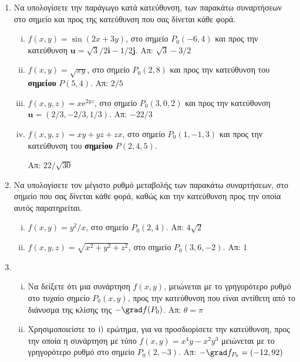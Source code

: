 \begin{enumerate}

  \item Να υπολογίσετε την παράγωγο κατά κατεύθυνση, των παρακάτω συναρτήσεων στο σημείο 
    και προς της κατεύθυνση που σας δίνεται κάθε φορά.
    \begin{enumerate}[i)]
      \item $ f(x,y) = \sin{(2x+3y)} $, στο σημείο $ P_{0}(-6,4) $ και προς την
        κατεύθυνση  $ \mathbf{u} = \sqrt{3} /2 \mathbf{i} - 1/2 \mathbf{j}$. 
        \hfill Απ: $ \sqrt{3} - 3/2 $ 
      \item $ f(x,y) = \sqrt{xy} $, στο σημείο $ P_{0}(2,8) $ και προς την
        κατεύθυνση του \textbf{σημείου} $P(5,4) $. \hfill Απ: $ 2 / 5 $ 
      \item $ f(x,y,z) = x \mathrm{e}^{2yz} $, στο σημείο $ P_{0}(3,0,2) $ και προς την
        κατεύθυνση  $ \mathbf{u} = (2/3, -2/3 , 1/3) $. 
        \hfill Απ: $-22/3$ 
      \item $ f(x,y,z) = xy+yz+zx $, στο σημείο $ P_{0}(1,-1,3) $ και προς την
        κατεύθυνση  του \textbf{σημείου} $P(2,4,5)$. 

        \hfill Απ: $ 22/\sqrt{30} $
    \end{enumerate}

  \item Να υπολογίσετε τον μέγιστο ρυθμό μεταβολής των παρακάτω συναρτήσεων, στο σημείο 
    που σας δίνεται κάθε φορά, καθώς και την κατεύθυνση προς την οποία αυτός 
    παρατηρείται.
    \begin{enumerate}[i)]
      \item $ f(x,y) = y^{2}/x $, στο σημείο $ P_{0}(2,4) $.
        \hfill Απ: $4 \sqrt{2}$ 
      \item $ f(x,y,z) = \sqrt{x^{2}+y^{2}+z^{2}} $, στο σημείο $ P_{0}(3,6,-2) $.
        \hfill Απ: $ 1 $
    \end{enumerate}

  \item 
    \begin{enumerate}[i)]
      \item Να δείξετε ότι μια συνάρτηση $ f(x,y) $, μειώνεται με το γρηγορότερο ρυθμό
        στο τυχαίο σημείο $ P_{0}(x,y) $, προς την κατεύθυνση που είναι αντίθετη από το 
        διάνυσμα της κλίσης της $ - \grad f(P_{0}) $.
        \hfill Απ: $ \theta = \pi $  
      \item Χρησιμοποιείστε το $ \rm{i)} $ ερώτημα, για να προσδιορίσετε την κατεύθυνση,
        προς την οποία η συνάρτηση με τύπο $ f(x,y) = x^{4}y-x^{2}y^{3} $ μειώνεται με 
        το γρηγορότερο ρυθμό στο σημείο $ P_{0}(2,-3) $. 
        \hfill Απ: $ - \grad f_{P_{0}} = (-12,92) $
    \end{enumerate}


\end{enumerate}
